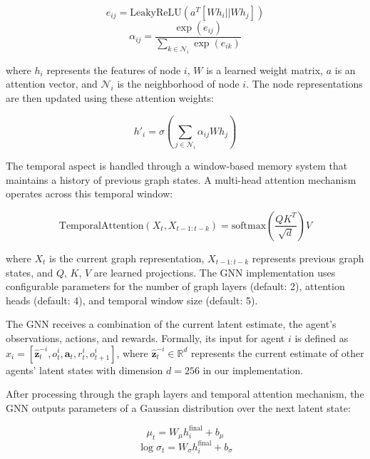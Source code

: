 \documentclass[a4paper,12pt]{report}
\begin{document}
\begin{equation}
    e_{ij} = \text{LeakyReLU}(a^T[Wh_i || Wh_j])
\end{equation}
\begin{equation}
    \alpha_{ij} = \frac{\exp(e_{ij})}{\sum_{k \in \mathcal{N}_i} \exp(e_{ik})}
\end{equation}

where $h_i$ represents the features of node $i$, $W$ is a learned weight matrix, $a$ is an attention vector, and $\mathcal{N}_i$ is the neighborhood of node $i$. The node representations are then updated using these attention weights:

\begin{equation}
    h'_i = \sigma\left(\sum_{j \in \mathcal{N}_i} \alpha_{ij} W h_j\right)
\end{equation}

The temporal aspect is handled through a window-based memory system that maintains a history of previous graph states. A multi-head attention mechanism operates across this temporal window:

\begin{equation}
    \text{TemporalAttention}(X_t, X_{t-1:t-k}) = \text{softmax}\left(\frac{QK^T}{\sqrt{d}}\right)V
\end{equation}

where $X_t$ is the current graph representation, $X_{t-1:t-k}$ represents previous graph states, and $Q$, $K$, $V$ are learned projections. The GNN implementation uses configurable parameters for the number of graph layers (default: 2), attention heads (default: 4), and temporal window size (default: 5).

The GNN receives a combination of the current latent estimate, the agent's observations, actions, and rewards. Formally, its input for agent $i$ is defined as $x_i = [\hat{\boldsymbol{z}}^{-i}_{t}, o^{i}_{t}, \boldsymbol{a}_{t}, r^{i}_{t}, o^{i}_{t+1}]$, where $\hat{\boldsymbol{z}}^{-i}_{t} \in \mathbb{R}^{d}$ represents the current estimate of other agents' latent states with dimension $d=256$ in our implementation.

After processing through the graph layers and temporal attention mechanism, the GNN outputs parameters of a Gaussian distribution over the next latent state:

\begin{equation}
    \mu_{t} = W_{\mu}h^{\text{final}}_i + b_{\mu}
\end{equation}
\begin{equation}
    \log\sigma_{t} = W_{\sigma}h^{\text{final}}_i + b_{\sigma}
\end{equation}
\end{document}
